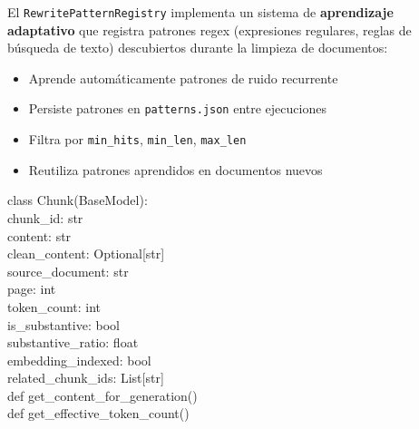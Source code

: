 \documentclass[10pt,twocolumn,letterpaper]{article}
\begin{document}
El \texttt{RewritePatternRegistry} implementa un sistema de \textbf{aprendizaje
adaptativo} que registra patrones regex (expresiones regulares, reglas de b\'usqueda
de texto) descubiertos durante la limpieza de documentos:

\begin{itemize}[nosep,leftmargin=*]
  \item Aprende autom\'aticamente patrones de ruido recurrente
  \item Persiste patrones en \texttt{patterns.json} entre ejecuciones
  \item Filtra por \texttt{min\_hits}, \texttt{min\_len}, \texttt{max\_len}
  \item Reutiliza patrones aprendidos en documentos nuevos
\end{itemize}

\begin{tcolorbox}[colback=agentZ!5, colframe=agentZ, title={\small Modelo de Chunk},
  fonttitle=\bfseries\small, boxrule=0.5pt, arc=3pt]
{\small\ttfamily
class Chunk(BaseModel):\\
\hspace*{1em}chunk\_id: str\\
\hspace*{1em}content: str\\
\hspace*{1em}clean\_content: Optional[str]\\
\hspace*{1em}source\_document: str\\
\hspace*{1em}page: int\\
\hspace*{1em}token\_count: int\\
\hspace*{1em}is\_substantive: bool\\
\hspace*{1em}substantive\_ratio: float\\
\hspace*{1em}embedding\_indexed: bool\\
\hspace*{1em}related\_chunk\_ids: List[str]\\[4pt]
\hspace*{1em}def get\_content\_for\_generation()\\
\hspace*{1em}def get\_effective\_token\_count()
}
\end{tcolorbox}
\end{document}
